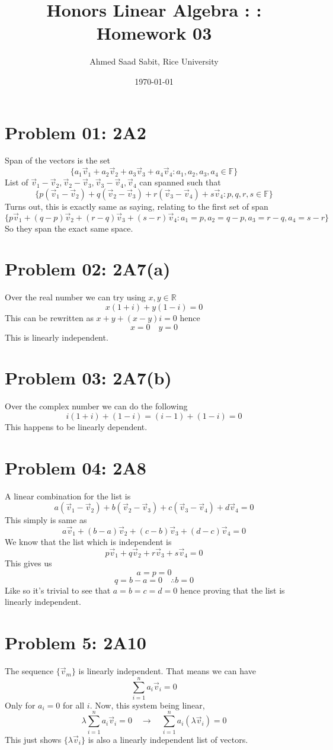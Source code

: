 \documentclass[letter]{article}
\title{Honors Linear Algebra : : Homework 03}
\author{Ahmed Saad Sabit, Rice University}
\date{\today}
\begin{document}
\maketitle
\section*{Problem 01: 2A2} Span of the vectors is the set 
\[
	\{a_1 \vec{v}_1 + a_2 \vec{v}_2 + a_3 \vec{v}_3 + a_4 \vec{v}_4 : a_1,a_2,a_3,a_4 \in \mathbb{F}\} 
\] 
List of $\vec{v}_1-\vec{v}_2, \vec{v}_2 - \vec{v}_3, \vec{v}_3 - \vec{v}_4, \vec{v}_4 $ can spanned such that 
\[
\{p (\vec{v}_1 - \vec{v}_2) + q \left(\vec{v}_2 - \vec{v}_3\right) + r
\left(\vec{v}_3 - \vec{v}_4\right) + s \vec{v}_4 : p,q,r,s \in \mathbb{F}\}
\]
Turns out, this is exactly same as saying, relating to the first set of span
\[
\{p \vec{v}_1+ (q-p) \vec{v}_2 + (r-q)\vec{v}_3 + (s-r)\vec{v}_4: a_1 = p, a_2 = q-p, a_3 = r-q, a_4 = s -r \} 
\]
So they span the exact same space. 

\section*{Problem 02: 2A7(a)} 
Over the real number we can try using $x,y \in \mathbb{R}$ 
\[
x (1+i) + y (1-i) = 0
\]
This can be rewritten as $x+y + (x-y) i = 0$ hence 
\[
x = 0 \quad y =0 
\]
This is linearly independent. 

\section*{Problem 03: 2A7(b)} 
Over the complex number we can do the following 
\[
i (1+i) + (1 -i) = (i-1) + (1-i) = 0
\]
This happens to be linearly dependent. 

\section*{Problem 04: 2A8}
A linear combination for the list is 
\[
a(\vec{v}_1 - \vec{v}_2) + b(\vec{v}_2 - \vec{v}_3) + c(\vec{v}_3 - \vec{v}_4) + d \vec{v}_4 = 0
\] 
This simply is same as
\[
a \vec{v}_1 + (b-a) \vec{v}_2 + (c-b) \vec{v}_3 + (d-c) \vec{v}_4 = 0
\]
We know that the list which is independent is 
\[
p \vec{v}_1 + q \vec{v}_2 + r \vec{v}_3 + s \vec{v}_4 = 0
\]
This gives us 
\[
a = p = 0
\]
\[
q = b-a = 0\quad \therefore b = 0
\]  
Like so it's trivial to see that $a=b=c=d = 0$ hence proving that the list is linearly independent.

\section*{Problem 5: 2A10} 
The sequence $\{\vec{v}_m\}$ is linearly independent. That means we can have 
\[
\sum_{i = 1}^{n} a_i \vec{v}_i = 0
\]
Only for $a_i = 0$ for all $i$. Now, this system being linear, 
\[
\lambda \sum_{i = 1}^{n} a_i \vec{v}_i = 0
\quad \rightarrow \quad \sum_{i = 1}^{n} a_i (\lambda\vec{v}_i) = 0
\]
This just shows $\{\lambda \vec{v}_i\} $ is also a linearly independent list of vectors.
\end{document}
